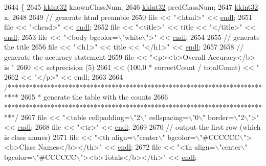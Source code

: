 \begin{DoxyCode}
2644 \{
2645   \hyperlink{namespace_k_k_b_a8fa4952cc84fda1de4bec1fbdd8d5b1b}{kkint32} knownClassNum;
2646   \hyperlink{namespace_k_k_b_a8fa4952cc84fda1de4bec1fbdd8d5b1b}{kkint32} predClassNum;
2647   \hyperlink{namespace_k_k_b_a8fa4952cc84fda1de4bec1fbdd8d5b1b}{kkint32} x;
2648 
2649   \textcolor{comment}{// generate html preamble}
2650   file << \textcolor{stringliteral}{"<html>"} << \hyperlink{namespace_k_k_b_ad1f50f65af6adc8fa9e6f62d007818a8}{endl};
2651   file << \textcolor{stringliteral}{"<head>"} << \hyperlink{namespace_k_k_b_ad1f50f65af6adc8fa9e6f62d007818a8}{endl};
2652   file << \textcolor{stringliteral}{"<title>"} << title << \textcolor{stringliteral}{"</title>"} << \hyperlink{namespace_k_k_b_ad1f50f65af6adc8fa9e6f62d007818a8}{endl};
2653   file << \textcolor{stringliteral}{"<body bgcolor=\(\backslash\)"white\(\backslash\)">"} << \hyperlink{namespace_k_k_b_ad1f50f65af6adc8fa9e6f62d007818a8}{endl};
2654 
2655   \textcolor{comment}{// generate the title}
2656   file  << \textcolor{stringliteral}{"<h1>"} << title << \textcolor{stringliteral}{"</h1>"} << \hyperlink{namespace_k_k_b_ad1f50f65af6adc8fa9e6f62d007818a8}{endl};
2657 
2658   \textcolor{comment}{// generate the accuracy statement}
2659   file  << \textcolor{stringliteral}{"<p><b>Overall Accuracy</b> is "} 
2660       << setprecision (5)
2661       << (100.0 * correctCount / totalCount) << \textcolor{stringliteral}{"%
2662       << \textcolor{stringliteral}{"</p>"} << endl;
2663 
2664   \textcolor{comment}{/***************************************************************************}
2665 \textcolor{comment}{   * generate the table with the counts}
2666 \textcolor{comment}{   ***************************************************************************/}
2667   file << \textcolor{stringliteral}{"<table cellpadding=\(\backslash\)"2\(\backslash\)" cellspacing=\(\backslash\)"0\(\backslash\)" border=\(\backslash\)"2\(\backslash\)">"} << \hyperlink{namespace_k_k_b_ad1f50f65af6adc8fa9e6f62d007818a8}{endl};
2668   file << \textcolor{stringliteral}{"<tr>"} << \hyperlink{namespace_k_k_b_ad1f50f65af6adc8fa9e6f62d007818a8}{endl};
2669 
2670   \textcolor{comment}{// output the first row (which is class names)}
2671   file << \textcolor{stringliteral}{"<th align=\(\backslash\)"center\(\backslash\)" bgcolor=\(\backslash\)"#CCCCCC\(\backslash\)"><b>Class Names</b></th>"} << 
      \hyperlink{namespace_k_k_b_ad1f50f65af6adc8fa9e6f62d007818a8}{endl};
2672   file << \textcolor{stringliteral}{"<th align=\(\backslash\)"center\(\backslash\)" bgcolor=\(\backslash\)"#CCCCCC\(\backslash\)"><b>Totals</b></th>"} << \hyperlink{namespace_k_k_b_ad1f50f65af6adc8fa9e6f62d007818a8}{endl};
}
\end{DoxyCode}
